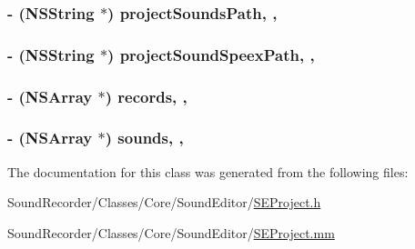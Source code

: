 \hypertarget{interface_s_e_project_aed6c39bde3642e161be44d0adfb431e0}{
\subsubsection[{project\-Sounds\-Path}]{\setlength{\rightskip}{0pt plus 5cm}-\/ (N\-S\-String $\ast$) project\-Sounds\-Path\hspace{0.3cm}{\ttfamily [read]}, {\ttfamily [nonatomic]}, {\ttfamily [assign]}}}\label{interface_s_e_project_aed6c39bde3642e161be44d0adfb431e0}
\hypertarget{interface_s_e_project_ac31124fe234f12a0d4c196622aaf5039}{
\subsubsection[{project\-Sound\-Speex\-Path}]{\setlength{\rightskip}{0pt plus 5cm}-\/ (N\-S\-String $\ast$) project\-Sound\-Speex\-Path\hspace{0.3cm}{\ttfamily [read]}, {\ttfamily [nonatomic]}, {\ttfamily [assign]}}}\label{interface_s_e_project_ac31124fe234f12a0d4c196622aaf5039}
\hypertarget{interface_s_e_project_ad1fc62c52cc1e466cf805092c8ab8288}{
\subsubsection[{records}]{\setlength{\rightskip}{0pt plus 5cm}-\/ (N\-S\-Array $\ast$) records\hspace{0.3cm}{\ttfamily [read]}, {\ttfamily [nonatomic]}, {\ttfamily [assign]}}}\label{interface_s_e_project_ad1fc62c52cc1e466cf805092c8ab8288}
\hypertarget{interface_s_e_project_a916ce006afc2e4eb7ccf40af12080de8}{
\subsubsection[{sounds}]{\setlength{\rightskip}{0pt plus 5cm}-\/ (N\-S\-Array $\ast$) sounds\hspace{0.3cm}{\ttfamily [read]}, {\ttfamily [nonatomic]}, {\ttfamily [assign]}}}\label{interface_s_e_project_a916ce006afc2e4eb7ccf40af12080de8}


The documentation for this class was generated from the following files\-:\begin{DoxyCompactItemize}
\item 
Sound\-Recorder/\-Classes/\-Core/\-Sound\-Editor/\hyperlink{_s_e_project_8h}{S\-E\-Project.\-h}\item 
Sound\-Recorder/\-Classes/\-Core/\-Sound\-Editor/\hyperlink{_s_e_project_8mm}{S\-E\-Project.\-mm}\end{DoxyCompactItemize}
